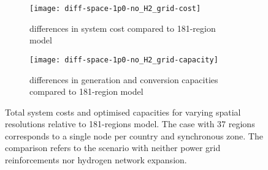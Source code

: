 \begin{figure}
    \centering
    \begin{subfigure}[t]{\textwidth}
        \centering
        \caption{differences in system cost compared to 181-region model}
        \texttt{[image: diff-space-1p0-no\_H2\_grid-cost]}
        \label{fig:sensitivity-space-cost}
    \end{subfigure}
    \begin{subfigure}[t]{\textwidth}
        \centering
        \caption{differences in generation and conversion capacities compared to 181-region model}
        \texttt{[image: diff-space-1p0-no\_H2\_grid-capacity]}
        \label{fig:sensitivity-space-cap}
    \end{subfigure}
    \caption{ Total system costs and optimised capacities for varying spatial
    resolutions relative to 181-regions model. The case with 37 regions corresponds to
    a single node per country and synchronous zone. The comparison refers to the scenario
    with neither power grid reinforcements nor hydrogen network expansion. }
    \label{fig:sensitivity-space}
\end{figure}
